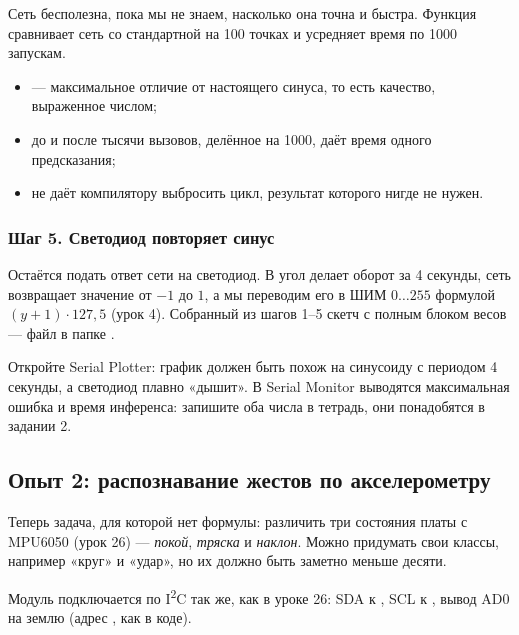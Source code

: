 Сеть бесполезна, пока мы не знаем, насколько она точна и быстра. Функция  сравнивает
сеть со стандартной  на 100 точках и усредняет время по 1000 запускам.


\begin{itemize}[leftmargin=*]
  \item {} --- максимальное отличие от настоящего синуса, то есть качество, выраженное числом;
  \item {} до и после тысячи вызовов, делённое на 1000, даёт время одного предсказания;
  \item {} не даёт компилятору выбросить цикл, результат которого нигде не нужен.
\end{itemize}

\subsubsection{Шаг 5. Светодиод повторяет синус}

Остаётся подать ответ сети на светодиод. В  угол  делает оборот за 4 секунды, сеть
возвращает значение от $-1$ до $1$, а мы переводим его в ШИМ $0\ldots255$ формулой $(y+1)\cdot127{,}5$ (урок 4).
Собранный из шагов 1--5 скетч с полным блоком весов --- файл  в папке .


Откройте Serial Plotter: график  должен быть похож на синусоиду с периодом 4 секунды,
а светодиод плавно «дышит». В Serial Monitor выводятся максимальная ошибка и время инференса:
запишите оба числа в тетрадь, они понадобятся в задании 2.

\subsection{Опыт 2: распознавание жестов по акселерометру}

Теперь задача, для которой нет формулы: различить три состояния платы с MPU6050 (урок 26) ---
\emph{покой}, \emph{тряска} и \emph{наклон}. Можно придумать свои классы, например «круг» и «удар»,
но их должно быть заметно меньше десяти.

Модуль подключается по I\textsuperscript{2}C так же, как в уроке 26: SDA к , SCL к ,
вывод AD0 на землю (адрес , как в коде).

